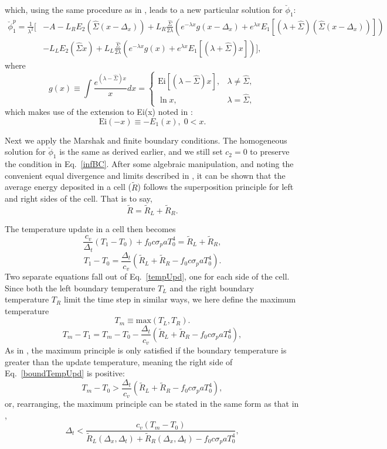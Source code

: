 which, using the same procedure as in \cite{WolLarDen}, leads to a new
particular solution for $\breve\phi_1$:
\begin{align}
\breve\phi^p_1=\frac{1}{\lambda^2}\bigg[
  &-A-L_RE_2(\hat\Sigma(x-\Delta_x))+L_R\frac{\hat\Sigma}{2\lambda}\left(
    e^{-\lambda x}g(x-\Delta_x)+
    e^{\lambda x}E_1[(\lambda+\hat\Sigma)(\hat\Sigma(x-\Delta_x))]
    \right)\nonumber\\
  &-L_LE_2(\hat\Sigma x)+L_L\frac{\hat\Sigma}{2\lambda}\left(
    e^{-\lambda x}g(x)+e^{\lambda x}E_1[(\lambda+\hat\Sigma)x]\right)\bigg],
\end{align}
where
\begin{equation}
g(x)\equiv\int\frac{e^{(\lambda-\hat\Sigma)x}}{x}dx=
\begin{cases}
\mbox{Ei}[(\lambda-\hat\Sigma)x], & \lambda\neq\hat\Sigma, \\
\ln{x}, & \lambda=\hat\Sigma,
\end{cases}
\end{equation}
which makes use of the extension to Ei(x) noted in \cite{MathFunc}:
\[\mbox{Ei}(-x)\equiv-E_1(x),\; 0<x.\]

Next we apply the Marshak and finite boundary conditions.  The homogeneous
solution for $\breve\phi_1$ is the same as derived earlier, and we still set
$c_2=0$ to preserve the condition in Eq.\ \eqref{infBC}.  After some algebraic
manipulation, and noting the convenient equal divergence and limits described
in \cite{WolLarDen}, it can be shown that the average energy deposited in a
cell ($\tilde R$) follows the superposition principle for left and right sides
of the cell.  That is to say,
\[\tilde R = \tilde R_L + \tilde R_R.\]

The temperature update in a cell then becomes
\[\frac{c_v}{\Delta_t}(T_1-T_0)+f_0c\sigma_p aT_0^4=\tilde R_L+\tilde R_R,\]
\begin{equation}
T_1-T_0=\frac{\Delta_t}{c_v}(\tilde R_L+\tilde R_R-f_0c\sigma_p aT_0^4).
\label{tempUpd}
\end{equation}
Two separate equations fall out of Eq.\ \eqref{tempUpd}, one for each side of
the cell.  Since both the left boundary temperature $T_L$ and the right
boundary temperature $T_R$ limit the time step in similar ways, we here
define the maximum temperature
\[T_m\equiv\mbox{max}(T_L,T_R). \]
\begin{equation}\label{boundTempUpd}
T_m-T_1=T_m-T_0-\frac{\Delta_t}{c_v}(\tilde R_L+\tilde R_R-f_0c\sigma_p aT_0^4),
\end{equation}
As in \cite{WolLarDen}, the maximum principle is only satisfied if the boundary
temperature is greater than the update temperature, meaning the right side of
Eq.\ \eqref{boundTempUpd} is positive:
\begin{equation}\label{DMP_LR}
T_m-T_0>\frac{\Delta_t}{c_v}(\tilde R_L+\tilde R_R-f_0c\sigma_p aT_0^4),
\end{equation}
or, rearranging, the maximum principle can be stated in the same form as that
in \cite{WolLarDen},
\begin{equation}
\Delta_t < \frac{c_v(T_m-T_0)}{\tilde R_L(\Delta_x,\Delta_t)+\tilde
  R_R(\Delta_x,\Delta_t) - f_0c\sigma_p aT_0^4},
\end{equation}

